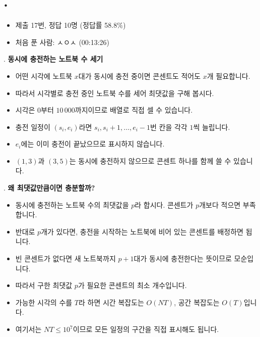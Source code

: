 
\section{\texorpdfstring{\pletter. \ptitle}{문제 \pletter}}

\begin{frame}[label=problem-F]
    \sectiontitle{\pletter}{\ptitle}
    \begin{itemize}
        \item 제출 17번, 정답 10명 (정답률 58.8\%)
        \item 처음 푼 사람: ㅅㅇㅅ (00:13:26)
    \end{itemize}
\end{frame}

\begin{frame}{\textbf{\pletter}. \ptitle}
    \textbf{동시에 충전하는 노트북 수 세기}
\begin{itemize}
        \item 어떤 시각에 노트북 $x$대가 동시에 충전 중이면 콘센트도 적어도 $x$개 필요합니다.
        \item 따라서 시각별로 충전 중인 노트북 수를 세어 최댓값을 구해 봅시다.
        \item 시각은 $0$부터 $10\,000$까지이므로 배열로 직접 셀 수 있습니다.
        \item 충전 일정이 $(s_i,e_i)$라면 $s_i,s_i+1,\ldots,e_i-1$번 칸을 각각 $1$씩 늘립니다.
        \item $e_i$에는 이미 충전이 끝났으므로 표시하지 않습니다.
        \item $(1,3)$과 $(3,5)$는 동시에 충전하지 않으므로 콘센트 하나를 함께 쓸 수 있습니다.
    \end{itemize}
\end{frame}

\begin{frame}{\textbf{\pletter}. \ptitle}
    \textbf{왜 최댓값만큼이면 충분할까?}
\begin{itemize}
        \item 동시에 충전하는 노트북 수의 최댓값을 $p$라 합시다. 콘센트가 $p$개보다 적으면 부족합니다.
        \item 반대로 $p$개가 있다면, 충전을 시작하는 노트북에 비어 있는 콘센트를 배정하면 됩니다.
        \item 빈 콘센트가 없다면 새 노트북까지 $p+1$대가 동시에 충전한다는 뜻이므로 모순입니다.
        \item 따라서 구한 최댓값 $p$가 필요한 콘센트의 최소 개수입니다.
        \item 가능한 시각의 수를 $T$라 하면 시간 복잡도는 $O(NT)$, 공간 복잡도는 $O(T)$입니다.
        \item 여기서는 $NT\le10^7$이므로 모든 일정의 구간을 직접 표시해도 됩니다.
    \end{itemize}
\end{frame}
